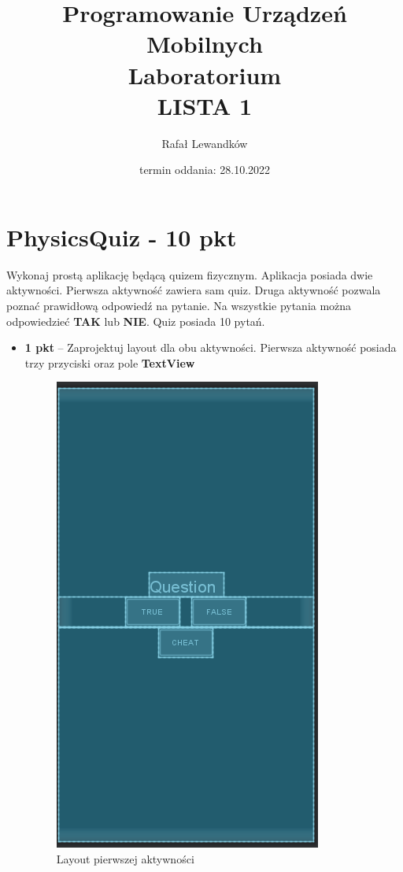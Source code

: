 \documentclass[a4paper]{article}
\title{Programowanie Urządzeń Mobilnych \\ Laboratorium \\ \textbf{LISTA 1}}
\author{Rafał Lewandków}
\date{termin oddania: 28.10.2022}
\begin{document}
\maketitle
    

\section*{PhysicsQuiz - 10 pkt}

Wykonaj prostą aplikację będącą quizem fizycznym. Aplikacja posiada dwie aktywności. Pierwsza aktywność zawiera sam quiz. Druga aktywność pozwala poznać prawidłową odpowiedź na pytanie. Na wszystkie pytania można odpowiedzieć \textbf{TAK} lub \textbf{NIE}. Quiz posiada 10 pytań.

\begin{itemize}
\item \textbf{1 pkt} -- Zaprojektuj layout dla obu aktywności. Pierwsza aktywność posiada trzy przyciski oraz pole \textbf{TextView}

\begin{figure}[h]
\centering
\caption{Layout pierwszej aktywności}
\includegraphics[scale=0.7]{l1.png}
\end{figure}


\end{itemize}
\end{document}

